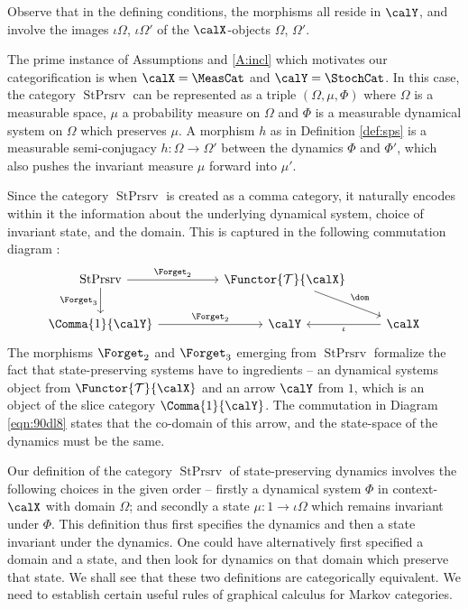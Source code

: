 \documentclass[12pt,oneside,pb-diagram]{article}
\DeclareMathOperator{\sps}{StPrsrv}
\begin{document}
Observe that in the defining conditions, the morphisms all reside in $\calY$, and involve the images $\iota \Omega$, $\iota \Omega'$ of the $\calX$-objects $\Omega$, $\Omega'$.

\begin{Erg}{}{} 
	The prime instance of Assumptions  and \ref{A:incl} which motivates our categorification is when $\calX=\MeasCat$ and $\calY=\StochCat$. In this case, the category $\sps$ can be represented as a triple $(\Omega, \mu, \Phi)$ where $\Omega$ is a measurable space, $\mu$ a probability measure on $\Omega$ and $\Phi$ is a measurable dynamical system on $\Omega$ which preserves $\mu$. A morphism $h$ as in Definition \ref{def:sps} is a measurable semi-conjugacy $h : \Omega \to \Omega'$ between the dynamics $\Phi$ and $\Phi'$, which also pushes the invariant measure $\mu$ forward into $\mu'$.
\end{Erg}

Since the category $\sps$ is created as a comma category, it naturally encodes within it the information about the underlying dynamical system, choice of invariant state, and the domain. This is captured in the following commutation diagram :
%
\begin{equation} \label{eqn:90dl8}
	\begin{tikzcd}
		\sps \arrow[rr, "\Forget_2"] \arrow[d, "\Forget_3"'] && \Functor{\Time}{\calX} \arrow[dr, "\dom"] \\
		\Comma{1}{\calY} \arrow[rr, "\Forget_2"] && \calY & \calX \arrow[l, "\iota"]
	\end{tikzcd}
\end{equation}
%
The morphisms $\Forget_2$ and $\Forget_3$ emerging from $\sps$ formalize the fact that state-preserving systems have to ingredients -- an dynamical systems object from $\Functor{\Time}{\calX}$ and an arrow $\calY$ from $1$, which is an object of the slice category $\Comma{1}{\calY}$. The commutation in Diagram \eqref{eqn:90dl8} states that the co-domain of this arrow, and the state-space of the dynamics must be the same.

Our definition of the category $\sps$ of state-preserving dynamics involves the following choices in the given order -- firstly a dynamical system $\Phi$ in context-$\calX$ with domain $\Omega$; and secondly a state $\mu : 1 \to \iota \Omega$ which remains invariant under $\Phi$. This definition thus first specifies the dynamics and then a state invariant under the dynamics. One could have alternatively first specified a domain and a state, and then look for dynamics on that domain which preserve that state. We shall see that these two definitions are categorically equivalent. We need to establish certain useful rules of graphical calculus for Markov categories.
\end{document}
